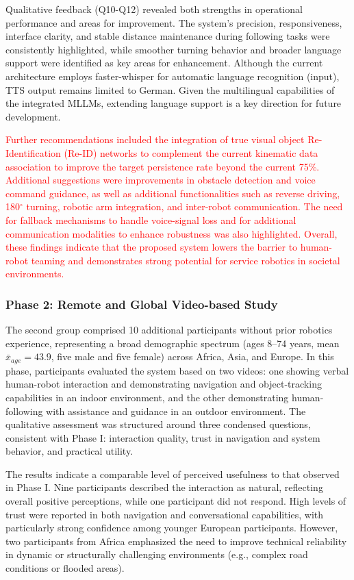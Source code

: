 \documentclass[lettersize,journal]{IEEEtran}
\begin{document}
Qualitative feedback (Q10-Q12) revealed both strengths in operational performance and areas for improvement. The system’s precision, responsiveness, interface clarity, and stable distance maintenance during following tasks were consistently highlighted, while smoother turning behavior and broader language support were identified as key areas for enhancement. Although the current architecture employs faster-whisper for automatic language recognition (input), TTS output remains limited to German. Given the multilingual capabilities of the integrated MLLMs, extending language support is a key direction for future development.

\textcolor{red}{
Further recommendations included the integration of true visual object Re-Identification (Re-ID) networks to complement the current kinematic data association to improve the target persistence rate beyond the current 75\%. Additional suggestions were improvements in obstacle detection and voice command guidance, as well as additional functionalities such as reverse driving, 180$^\circ$ turning, robotic arm integration, and inter-robot communication. The need for fallback mechanisms to handle voice-signal loss and for additional communication modalities to enhance robustness was also highlighted. Overall, these findings indicate that the proposed system lowers the barrier to human-robot teaming and demonstrates strong potential for service robotics in societal environments.}

\subsubsection{Phase 2: Remote and Global  Video-based Study}
The second group comprised 10 additional participants without prior robotics experience, representing a broad demographic spectrum (ages 8–74 years, mean $\bar{x}_{age} = 43.9$, five male and five female) across Africa, Asia, and Europe. In this phase, participants evaluated the system based on two videos: one showing verbal human-robot interaction and demonstrating navigation and object-tracking capabilities in an indoor environment, and the other demonstrating human-following with assistance and guidance in an outdoor environment. The qualitative assessment was structured around three condensed questions, consistent with Phase I: interaction quality, trust in navigation and system behavior, and practical utility.

The results indicate a comparable level of perceived usefulness to that observed in Phase I. Nine participants described the interaction as natural, reflecting overall positive perceptions, while one participant did not respond. High levels of trust were reported in both navigation and conversational capabilities, with particularly strong confidence among younger European participants. However, two participants from Africa emphasized the need to improve technical reliability in dynamic or structurally challenging environments (e.g., complex road conditions or flooded areas).
\end{document}
